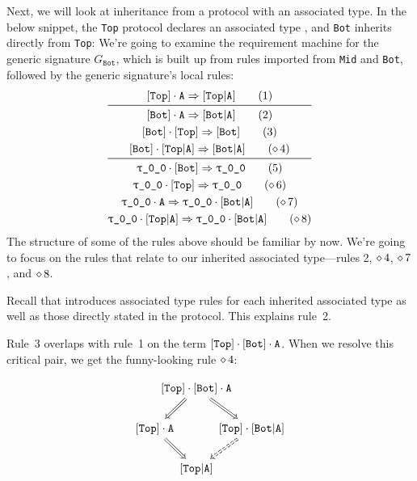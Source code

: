 \documentclass[../generics]{subfiles}
\begin{document}
\begin{example}\label{ex:associated type inheritance completion}
Next, we will look at inheritance from a protocol with an associated type. In the below snippet, the \texttt{Top} protocol declares an associated type \nA, and \texttt{Bot} inherits directly from \texttt{Top}:
We're going to examine the requirement machine for the generic signature $G_\texttt{Bot}$, which is built up from rules imported from \texttt{Mid} and \texttt{Bot}, followed by the generic signature's local rules:
\begin{gather*}
\AssocIntro{Top}{A}\tag{1}\\
\midrule
\AssocIntro{Bot}{A}\tag{2}\\
\ProtoInherit{Bot}{Top}\tag{3}\\
\protosym{Bot}\cdot\assocsym{Top}{A}\Red\assocsym{Bot}{A}\tag{$\CRule{4}$}\\
\midrule
\ProtoConf{\rT}{Bot}\tag{5}\\
\ProtoConf{\rT}{Top}\tag{$\CRule{6}$}\\
\rT\cdot\nA \Red \rT\cdot\assocsym{Bot}{A}\tag{$\CRule{7}$}\\
\rT\cdot\assocsym{Top}{A} \Red \rT\cdot\assocsym{Bot}{A}\tag{$\CRule{8}$}
\end{gather*}
The structure of some of the rules above should be familiar by now. We're going to focus on the rules that relate to our inherited associated type---rules 2, $\diamond\, 4$, $\diamond\, 7$, and $\diamond\, 8$.

Recall that  introduces associated type rules for each inherited associated type as well as those directly stated in the protocol. This explains rule~2.

Rule~3 overlaps with rule~1 on the term $[\texttt{Top}] \cdot [\texttt{Bot}] \cdot \texttt{A}$. When we resolve this critical pair, we get the funny-looking rule $\diamond\, 4$:
\begin{ceqn}
\[
\begin{tikzcd}[column sep=-2em]
& \protosym{Top} \cdot \protosym{Bot} \cdot \nA
\arrow[ld, Rightarrow]\arrow[rd, Rightarrow] \\
\protosym{Top} \cdot \nA \arrow[rd, Rightarrow] && \protosym{Top} \cdot \assocsym{Bot}{A} \arrow[ld, Rightarrow, dashed] \\
& \assocsym{Top}{A}
\end{tikzcd}
\]
\end{ceqn}


\end{example}
\end{document}
